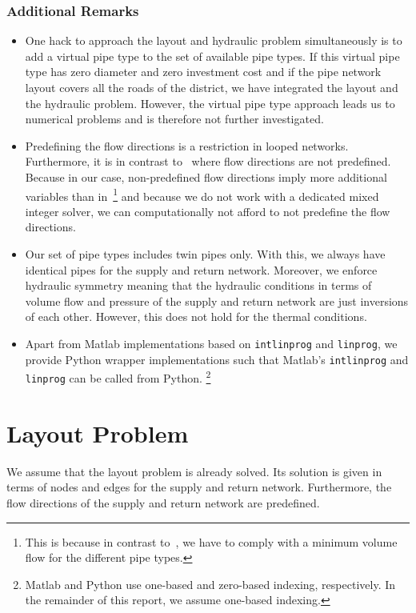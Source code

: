 \documentclass[a4paper,10pt]{article}
\begin{document}
\subsubsection{Additional Remarks}
\begin{itemize}
  \item One hack to approach the layout and hydraulic problem simultaneously is to add a virtual pipe type to the set of available pipe types. 
  If this virtual pipe type has zero diameter and zero investment cost and if the pipe network layout covers all the roads of the district, we have integrated the layout and the hydraulic problem. 
  However, the virtual pipe type approach leads us to numerical problems and is therefore not further investigated.
  \item Predefining the flow directions is a restriction in looped networks. 
  Furthermore, it is in contrast to~\cite{Raghunathan} where flow directions are not predefined. 
  Because in our case, non-predefined flow directions imply more additional variables than in~\cite{Raghunathan}\footnote{This is because in contrast to~\cite{Raghunathan}, we have to comply with a minimum volume flow for the different pipe types.} and because we do not work with a dedicated mixed integer solver, we can computationally not afford to not predefine the flow directions.
  \item Our set of pipe types includes twin pipes only. 
  With this, we always have identical pipes for the supply and return network. 
  Moreover, we enforce hydraulic symmetry meaning that the hydraulic conditions in terms of volume flow and pressure of the supply and return network are just inversions of each other. 
  However, this does not hold for the thermal conditions.
  \item Apart from Matlab implementations based on \texttt{intlinprog} and \texttt{linprog}, we provide Python wrapper implementations such that Matlab's \texttt{intlinprog} and \texttt{linprog} can be called from Python.
  \footnote{Matlab and Python use one-based and zero-based indexing, respectively. 
  In the remainder of this report, we assume one-based indexing.}
\end{itemize}



\section{Layout Problem}

We assume that the layout problem is already solved. 
Its solution is given in terms of nodes and edges for the supply and return network. 
Furthermore, the flow directions of the supply and return network are predefined.
\end{document}

